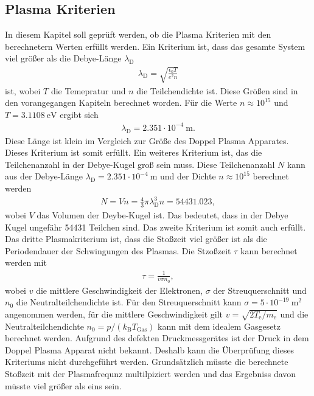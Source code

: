 \subsection{Plasma Kriterien}
In diesem Kapitel soll geprüft werden, ob die Plasma Kriterien mit den berechnetern Werten erfüllt werden. Ein Kriterium ist, dass das gesamte System viel größer als die Debye-Länge $\lambda_{\mathrm{D}}$
\begin{align}
\lambda_{\mathrm{D}} = \sqrt{\frac{\epsilon_0 T}{e^2 n}}
\end{align}
ist, wobei $T$ die Temepratur und $n$ die Teilchendichte ist. Diese Größen sind in den vorangegangen Kapiteln berechnet worden. Für die Werte $n \approx 10^{15} $ und $T=3.1108\ \mathrm{eV} $ ergibt sich
\begin{align}
\lambda_{\mathrm{D}} = 2.351 \cdot 10^{-4}\ \mathrm{m}.
\end{align}
Diese Länge ist klein im Vergleich zur Größe des Doppel Plasma Apparates. Dieses Kriterium ist somit erfüllt.  Ein weiteres Kriterium ist, das die Teilchenanzahl in der Debye-Kugel groß sein muss. Diese Teilchenanzahl  $N$ kann aus der Debye-Länge $\lambda_{\mathrm{D}}= 2.351 \cdot 10^{-4}\ \mathrm{m}$ und der Dichte $n \approx 10^{15}$ berechnet werden
\begin{align}
N = V n= \frac{4}{3}\pi \lambda_{\mathrm{D}}^3 n = 54431.023 ,
\end{align}
wobei $V$ das Volumen der Deybe-Kugel ist. Das bedeutet, dass in der Debye Kugel ungefähr 54431 Teilchen sind. Das zweite Kriterium ist somit auch erfüllt. Das dritte Plasmakriterium ist, dass die Stoßzeit viel größer ist als die Periodendauer der Schwingungen des Plasmas. Die Stzoßzeit $\tau$ kann berechnet werden mit
\begin{align}
  \tau = \frac{1}{v \sigma n_0},
\end{align}
wobei $v$ die mittlere Geschwindigkeit der Elektronen, $\sigma$  der Streuquerschnitt und $n_0$ die Neutralteilchendichte ist. Für den Streuquerschnitt kann $\sigma= 5 \cdot 10^{-19}\ \mathrm{m}^2 $ angenommen werden, für die mittlere Geschwindigkeit gilt $v= \sqrt{2 T_{\mathrm{e}}/m_{\mathrm{e}}} $ und die Neutralteilchendichte $n_0=p/(k_{\mathrm{B}}T_{\mathrm{Gas}})$ kann mit dem idealem Gasgesetz berechnet werden. Aufgrund des defekten Druckmessgerätes ist der Druck in dem Doppel Plasma Apparat nicht bekannt. Deshalb kann die Überprüfung dieses Kriteriums nicht durchgeführt werden. Grundsätzlich müsste die berechnete Stoßzeit mit der Plasmafrequnz multilpiziert werden und das Ergebniss davon müsste viel größer als eins sein. 


